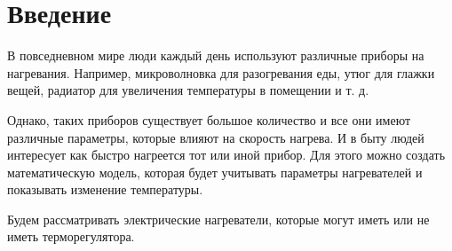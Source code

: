 \section{Введение}
    В повседневном мире люди каждый день используют различные приборы на нагревания. Например, микроволновка для разогревания еды, утюг для глажки вещей, радиатор для увеличения температуры в помещении и т. д.
    
    Однако, таких приборов существует большое количество и все они имеют различные параметры, которые влияют на скорость нагрева. И в быту людей интересует как быстро нагреется тот или иной прибор. Для этого можно создать математическую модель, которая будет учитывать параметры нагревателей и показывать изменение температуры.

    Будем рассматривать электрические нагреватели, которые могут иметь или не иметь терморегулятора.
